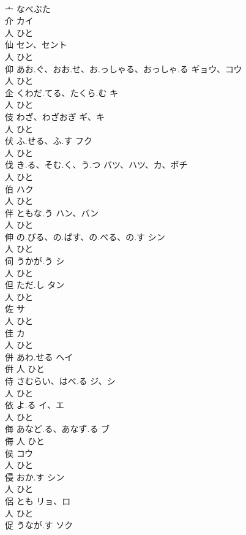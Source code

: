 \documentclass[8pt]{extreport}
\begin{document}
\begin{CJK}{UTF8}{min}
\\	亠		なべぶた		
\\	介		カイ	
\\	人		ひと		
\\	仙		セン、セント	
\\	人		ひと		
\\	仰	あお.ぐ、おお.せ、お.っしゃる、おっしゃ.る	ギョウ、コウ	
\\	人		ひと		
\\	企	くわだ.てる、たくら.む	キ	
\\	人		ひと		
\\	伎	わざ、わざおぎ	ギ、キ	
\\	人		ひと		
\\	伏	ふ.せる、ふ.す	フク	
\\	人		ひと		
\\	伐	き.る、そむ.く、う.つ	バツ、ハツ、カ、ボチ	
\\	人		ひと		
\\	伯		ハク	
\\	人		ひと		
\\	伴	ともな.う	ハン、バン	
\\	人		ひと		
\\	伸	の.びる、の.ばす、の.べる、の.す	シン	
\\	人		ひと		
\\	伺	うかが.う	シ	
\\	人		ひと		
\\	但	ただ.し	タン	
\\	人		ひと		
\\	佐		サ	
\\	人		ひと		
\\	佳		カ	
\\	人		ひと		
\\	併	あわ.せる	ヘイ	
\\	倂	人		ひと		
\\	侍	さむらい、はべ.る	ジ、シ	
\\	人		ひと		
\\	依	よ.る	イ、エ	
\\	人		ひと		
\\	侮	あなど.る、あなず.る	ブ	
\\	侮	人		ひと		
\\	侯		コウ	
\\	人		ひと		
\\	侵	おか.す	シン	
\\	人		ひと		
\\	侶	とも	リョ、ロ	
\\	人		ひと		
\\	促	うなが.す	ソク	

\end{CJK}
\end{document}
